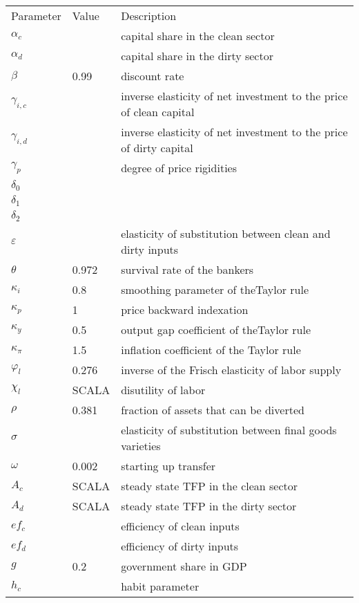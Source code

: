 \documentclass{article}
\begin{document}
\begin{center}
\begin{tabular}{lll}
Parameter & Value & Description \\ 
$\alpha _{c}$ &  & capital share in the clean sector \\ 
$\alpha _{d}$ &  & capital share in the dirty sector \\ 
$\beta $ & 0.99 & discount rate \\ 
$\gamma _{i,c}$ &  & inverse elasticity of net investment to the price of
clean capital \\ 
$\gamma _{i,d}$ &  & inverse elasticity of net investment to the price of
dirty capital \\ 
$\gamma _{p}$ &  & degree of price rigidities \\ 
$\delta _{0}$ &  &  \\ 
$\delta _{1}$ &  &  \\ 
$\delta _{2}$ &  &  \\ 
$\varepsilon $ &  & elasticity of substitution between clean and dirty inputs
\\ 
$\theta $ & 0.972 & survival rate of the bankers \\ 
$\kappa _{i}$ & 0.8 & smoothing parameter of theTaylor rule \\ 
$\kappa _{p}$ & 1 & price backward indexation \\ 
$\kappa _{y}$ & 0.5 & output gap coefficient of theTaylor rule \\ 
$\kappa _{\pi }$ & 1.5 & inflation coefficient of the Taylor rule \\ 
$\varphi _{l}$ & 0.276 & inverse of the Frisch elasticity of labor supply \\ 
$\chi _{l}$ & SCALA & disutility of labor \\ 
$\rho $ & 0.381 & fraction of assets that can be diverted \\ 
$\sigma $ &  & elasticity of substitution between final goods varieties \\ 
$\omega $ & 0.002 & starting up transfer \\ 
$A_{c}$ & SCALA & steady state TFP in the clean sector \\ 
$A_{d}$ & SCALA & steady state TFP in the dirty sector \\ 
$ef_{c}$ &  & efficiency of clean inputs \\ 
$ef_{d}$ &  & efficiency of dirty inputs \\ 
$g$ & 0.2 & government share in GDP \\ 
$h_{c}$ &  & habit parameter \\ 

\end{tabular}
\end{center}
\end{document}
